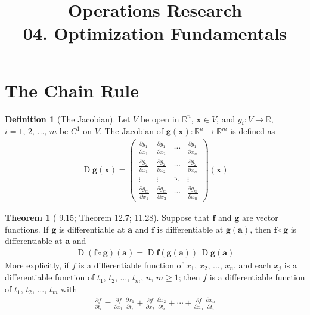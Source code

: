 \documentclass[10pt]{extarticle}
\DeclareMathOperator*{\jac}{D}
\theoremstyle{definition}
\newtheorem*{dfn}{Definition}
\newtheorem*{thm}{Theorem}
\newcommand{\va}{\mathbf{a}}
\newcommand{\vx}{\mathbf{x}}
\newcommand{\vf}{\mathbf{f}}
\newcommand{\vg}{\mathbf{g}}
\newcommand{\pdiff}[2]{\frac{\partial #1}{\partial #2}}
\begin{document}
\title{\texorpdfstring{\vspace{15mm} Operations Research\\ 04. Optimization Fundamentals}{Operations Research\\ 04. Optimization Fundamentals}} 
\author{}
\date{}
\maketitle
\newpage


\section*{The Chain Rule}
\begin{dfn}[The Jacobian]
  Let $V$ be open in $\mathbb{R}^n$, $\vx\in V$, and $g_i:V\to\mathbb{R}$, $i = 1,\,2,\,\ldots,\,m$ be $C^1$ on $V$. The Jacobian of $\vg(\vx): \mathbb{R}^n\to\mathbb{R}^m$ is defined as
  \begin{align*}
    \jac\vg(\vx) = %
    \begin{pmatrix}
      \frac{\partial g_1}{\partial x_1} & \frac{\partial g_1}{\partial x_2} & \cdots & \frac{\partial g_1}{\partial x_{\!n}} \\
      \frac{\partial g_2}{\partial x_1} & \frac{\partial g_2}{\partial x_2} & \cdots & \frac{\partial g_2}{\partial x_{\!n}} \\
      \vdots & \vdots & \ddots &\vdots \\
      \frac{\partial g_m}{\partial x_1} & \frac{\partial g_m}{\partial x_2} & \cdots & \frac{\partial g_m}{\partial x_{\!n}}
    \end{pmatrix}(\vx)
  \end{align*}
\end{dfn}
\begin{thm}[\citet{rudin} 9.15; \citet{apostol_adv} Theorem 12.7; \citet{wade} 11.28]
  Suppose that $\vf$ and $\vg$ are vector functions. If $\vg$ is differentiable at $\va$ and $\vf$ is differentiable at $\vg(\va)$, then $\vf\circ\vg$ is differentiable at $\va$ and
  \begin{align*}
    \jac(\vf\circ\vg)(\va) = \jac\vf(\vg(\va))\,\jac\vg(\va)
  \end{align*}
  More explicitly, if $f$ is a differentiable function of $x_1,\,x_2,\,\ldots,\,x_n$, and each $x_j$ is a differentiable function of $t_1,\,t_2,\,\ldots,\,t_m$, $n$, $m\geqslant 1$; then $f$ is a differentiable function of $t_1,\,t_2,\,\ldots,\,t_m$ with
  \begin{align*}
    \pdiff{f}{t_i} = \pdiff{f}{x_1}\,\pdiff{x_1}{t_i} + \pdiff{f}{x_2}\,\pdiff{x_2}{t_i} + \cdots + \pdiff{f}{x_n}\,\pdiff{x_n}{t_i}
  \end{align*}
\end{thm}
\end{document}
